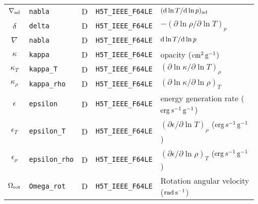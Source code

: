 \documentclass{article}
\newcommand{\diff}{\ensuremath{{\rm d}}}
\newcommand{\cm}{\ensuremath{{\rm cm}}}
\newcommand{\gram}{\ensuremath{{\rm g}}}
\newcommand{\second}{\ensuremath{{\rm s}}}
\newcommand{\erg}{\ensuremath{{\rm erg}}}
\begin{document}
\begin{table}[h!]
\begin{tabular}{|c|l|c|l|l|}
$\nabla_{\rm ad}$  & \texttt{nabla}        & D & \texttt{H5T\_IEEE\_F64LE} & $(\diff \ln T/\diff \ln p)_{\rm ad}$ \\
$\delta$      & \texttt{delta}            & D & \texttt{H5T\_IEEE\_F64LE} & $-(\partial \ln \rho/\partial \ln T)_{p}$  \\
$\nabla$          & \texttt{nabla}        & D & \texttt{H5T\_IEEE\_F64LE} & $\diff \ln T/\diff \ln p$ \\
$\kappa$          & \texttt{kappa}       & D &  \texttt{H5T\_IEEE\_F64LE} & opacity ($\cm^{2}\,\gram^{-1}$) \\
$\kappa_{T}$      & \texttt{kappa\_T}     & D &  \texttt{H5T\_IEEE\_F64LE} & $(\partial \ln \kappa/\partial \ln T)_{\rho}$ \\
$\kappa_{\rho}$   & \texttt{kappa\_rho}   & D &  \texttt{H5T\_IEEE\_F64LE} & $(\partial \ln \kappa/\partial \ln \rho)_{T}$ \\
$\epsilon$        & \texttt{epsilon}      & D &  \texttt{H5T\_IEEE\_F64LE} & energy generation rate ($\erg\,s^{-1}\,\gram^{-1}$) \\
$\epsilon_{T}$    & \texttt{epsilon\_T}   & D &  \texttt{H5T\_IEEE\_F64LE} & $(\partial \epsilon/\partial \ln T)_{\rho}$ ($\erg\,s^{-1}\,\gram^{-1}$) \\
$\epsilon_{\rho}$ & \texttt{epsilon\_rho} & D &  \texttt{H5T\_IEEE\_F64LE} & $(\partial \epsilon/\partial \ln \rho)_{T}$ ($\erg\,s^{-1}\,\gram^{-1}$) \\
$\Omega_{\rm rot}$ & \texttt{Omega\_rot}   & D & \texttt{H5T\_IEEE\_F64LE} & Rotation angular velocity (${\rm rad}\,\second^{-1}$) \\  \hline
\end{tabular}
\end{table}
\end{document}
